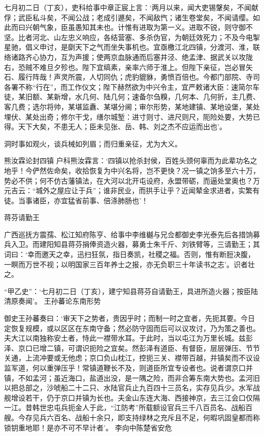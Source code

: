\documentclass[]{article}
\begin{document}
七月初二日（丁亥），吏科给事中章正宸上言：`两月以来，闻大吏锡鞶矣，不闻献俘；武臣私斗矣，不闻公战；老成引遯矣，不闻敌忾；诸生卷堂矣，不闻请缨。如此而曰兴朝气象，臣虽愚知其未也。计惟有进取为第一义。进取不锐，则守御不坚。比者河北、山左忠义响应，各结营塞、多杀伪官，为朝廷效死力；不及今电掣星驰，倡义申讨，是劘天下之气而坐失事机也。宜亟檄江北四镇，分渡河、淮，联络诸路齐心协力，互为声援；使两京血脉通而后塞井泾、绝孟津、据武关以攻陇右，恐贼不难旦夕殄也。陛下宜缟素，亲率六师于淮上。但陛下亲征，岂必冒矢石、履行阵哉！声灵所震，人切同仇；虎豹貔貅，勇愤百倍也。今都门部院、寺司各署不称``行在''，而工作仪文；陛下赫然欲为中兴令主，宜严敕诸大臣：速简尔车徒，某旧额、某新增，水几何、陆几何；速备尔刍糗，几何本、几何折，主几费、客几费；选尔将帅，某堪监纛、某堪分阃；审尔形势，某地建镇、某地设堡，某处埋伏、某处出奇；修尔干戈，缮尔城堑：进寸则寸、进尺则尺，阨险处要，大势已得。天下大矣，不患无人；臣未见张、岳、韩、刘之杰不应运而出也'。

洞时事如观火，谈兵械如列眉；而归重亲征，尤为大义。

熊汝霖论封四镇
户科熊汝霖言：`四镇以抢杀封侯，百姓头颈何辜而为此辈功名之地乎！今俨然佐命矣，收拾恢复为中兴名将，岂不更快？况一镇之饷多至六十万，势必不供；何不仿古藩镇法，在大河以北开屯设府，永盟带砺，而逼处堂奥也？万元吉云：``城外之屋应让于兵''；谁非民业，而拱手让乎？近闻辇金求进者，实繁有徒。当事诸臣，亦宜猛省前事、倍涤肺肠也'！

蒋芬请勤王

广西巡抚方震孺、松江知府陈亨、给事中李维樾与兄佥都御史李光泰先后各措饷募兵入卫。而建阳知县蒋芬捐俸资造火器，募勇士朱千斤、刘铁臂等，三请勤王；其词曰：`幸而邀天之幸，迅扫狂氛，指日奏凯，社稷之福。否则，惟有断脰决腹，一瞑而万世不视；以明国家三百年养士之报，亦无负职三十年读书之志'。识者壮之。

``甲乙史''：`七月初二日（丁亥），建宁知县蒋芬自请勤王，具进所造火器；按臣陆清原奏闻'。
王孙蕃论东南形势

御史王孙蕃奏曰：`审天下之势者，贵因乎时；而制一时之宜者，先扼其要。今日定恢复规模，或以区区在东南守备；然必防守固而后可以议攻讨，乃为策之善也。夫大江以南独称安土者，恃此一襟带水耳。于此时，当以屯江为万里长城。兹彭泽、京口已增二镇，可谓识扼险之宜矣。然彭泽有道臣、有督臣，层层弹压、节节关通，上流冲要或无他虑；京口负山枕江，控扼三关、襟带百越，并镇矣而不议设监军道，何以重弹压乎！常镇道鞭长不及，则道臣所宜专设者也。说者谓京口并镇，不如孟河；虽近海口，盐道出没，是一隅之险，而非合筹东南大势也。孟河旧以把总部之，沙唬船二十二只、水陆官兵止九百四十三员名，实存见兵少。水军战舰增设若干，仍于京口并镇为长也。夫金山东连大海、西接神京，去三江会口仅隔一江。昔韩世忠屯兵扼金人于此，``江防考''所载额设官兵三千八百员名、战船百艘。今存见兵六百名、战船十余只，即支持绿林之充斥且不足，何暇巩固皇都而称锁钥重地耶！是亦不可不早计者'。
李向中陈楚省安危
\end{document}
